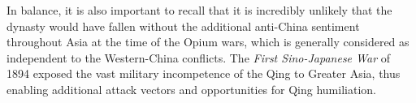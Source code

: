 \documentclass[a4paper,oneside]{article}
\newcommand{\wordcount}{3649}
\newcommand{\wordcountabstract}{3627}
\begin{document}
In balance, it is also important to recall that it is incredibly unlikely that
the dynasty would have fallen without the additional anti-China sentiment
throughout Asia at the time of the Opium wars, which is generally considered as
independent to the Western-China conflicts. The \textit{First Sino-Japanese War}
of 1894 exposed the vast military incompetence of the Qing to Greater Asia, thus
enabling additional attack vectors and opportunities for Qing humiliation.


\pagebreak
\setcounter{tocdepth}{1}
\printbibliography[title={Cited Works}, heading=bibintoc]
\end{document}
